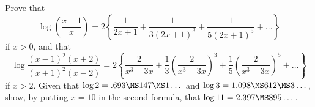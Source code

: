 Prove that
\[
\log \left(\frac{x + 1}{x}\right)
  = 2\left\{\frac{1}{2x + 1} + \frac{1}{3(2x + 1)^{3}} + \frac{1}{5(2x + 1)^{5}} + \dots\right\}
\]
if $x > 0$, and that
\[
\log \frac{(x - 1)^{2}(x + 2)}{(x + 1)^{2}(x - 2)}
  = 2\left\{\frac{2}{x^{3} - 3x}
          + \frac{1}{3}\left(\frac{2}{x^{3} - 3x}\right)^{3}
          + \frac{1}{5}\left(\frac{2}{x^{3} - 3x}\right)^{5} + \dots\right\}
\]
if $x > 2$. Given that $\log 2 = .693\MS147\MS1\dots$ and $\log 3 = 1.098\MS612\MS3\dots$, show, by
putting $x = 10$ in the second formula, that $\log 11 = 2.397\MS895\dots$.

